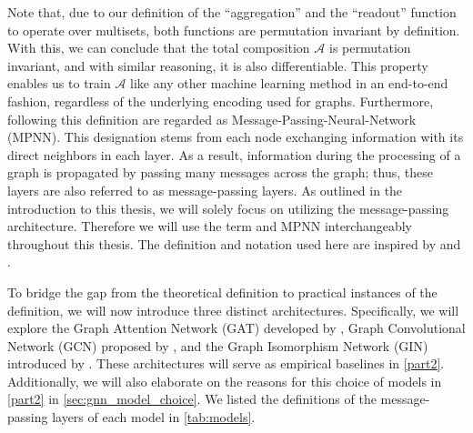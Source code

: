 Note that, due to our definition of the ``aggregation'' and the ``readout'' function to operate over multisets, both functions are permutation invariant by definition. With this, we can conclude that the total composition $\mathcal{A}$ is permutation invariant, and with similar reasoning, it is also differentiable. This property enables us to train $\mathcal{A}$ like any other machine learning method in an end-to-end fashion, regardless of the underlying encoding used for graphs. Furthermore, \gnns following this definition are regarded as \textsf{Message-Passing-Neural-Network (MPNN)}. This designation stems from each node exchanging information with its direct neighbors in each layer. As a result, information during the processing of a graph is propagated by passing many messages across the graph; thus, these layers are also referred to as message-passing layers. As outlined in the introduction to this thesis, we will solely focus on \gnns utilizing the message-passing architecture. Therefore we will use the term \gnn and \textsf{MPNN} interchangeably throughout this thesis. The definition and notation used here are inspired by \cite{Morris2018} and \cite{Xu2018}.

To bridge the gap from the theoretical definition to practical instances of the definition, we will now introduce three distinct \gnn architectures. Specifically, we will explore the \textsf{Graph Attention Network (GAT)} developed by \cite{Velivckovic2017}, \textsf{Graph Convolutional Network (GCN)} proposed by \cite{Kip+2017}, and the \textsf{Graph Isomorphism Network (GIN)} introduced by \cite{Xu2018}. These architectures will serve as empirical baselines in \cref{part2}. Additionally, we will also elaborate on the reasons for this choice of models in \cref{part2} in \cref{sec:gnn_model_choice}. We listed the definitions of the message-passing layers of each model in \cref{tab:models}.


